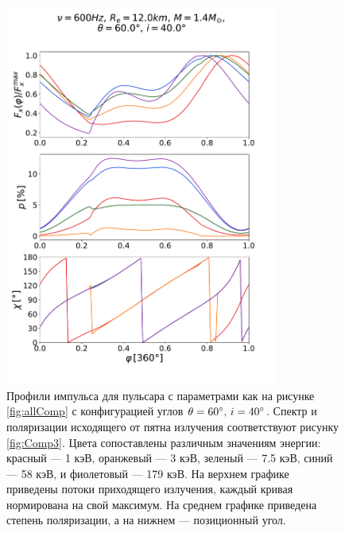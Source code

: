 \documentclass[14pt,a4paper]{extarticle}
\begin{document}
		\newpage
		\begin{figure}[H]
			\centering
			\includegraphics[width=0.8\textwidth]{CMComb12Ff.pdf}
			\caption{\small
				Профили импульса для пульсара с параметрами как на рисунке \ref{fig:allComp} с конфигурацией углов $\theta=60\degree,\,i=40\degree$.
				Спектр и поляризации исходящего от пятна излучения соответствуют рисунку \ref{fig:Comp3}.
				Цвета сопоставлены различным значениям энергии:
				красный --- 1 кэВ,
				оранжевый --- 3 кэВ,
				зеленый --- 7.5 кэВ,
				синий --- 58 кэВ,
				и фиолетовый --- 179 кэВ. На верхнем графике приведены потоки приходящего излучения, каждый кривая нормирована на свой максимум. 
				На среднем графике приведена степень поляризации, а на нижнем --- позиционный угол.
			}\label{fig:C3C}
		\end{figure}\newpage
\end{document}

